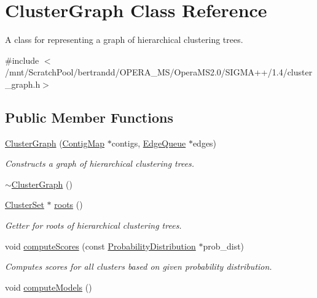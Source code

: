 \hypertarget{classClusterGraph}{
\section{ClusterGraph Class Reference}
\label{classClusterGraph}
}


A class for representing a graph of hierarchical clustering trees.  


{\ttfamily \#include $<$/mnt/ScratchPool/bertrandd/OPERA\_\-MS/OperaMS2.0/SIGMA++/1.4/cluster\_\-graph.h$>$}\subsection*{Public Member Functions}
\begin{DoxyCompactItemize}
\item 
\hyperlink{classClusterGraph_a5148b43897abe7a6d5d54b52e8bd4a9b}{ClusterGraph} (\hyperlink{contig_8h_aa2acb8d3b78def617ec4509a1f684c4e}{ContigMap} $\ast$contigs, \hyperlink{edge_8h_ada6d1f0d2fed8c49bc8ba085b524d726}{EdgeQueue} $\ast$edges)
\begin{DoxyCompactList}\small\item\em Constructs a graph of hierarchical clustering trees. \item\end{DoxyCompactList}\item 
\hyperlink{classClusterGraph_abe7d21fd3e9e14d61ed071b0def25995}{$\sim$ClusterGraph} ()
\item 
\hyperlink{cluster_8h_ac282f47ef6416737ea8a6f13a61bfd86}{ClusterSet} $\ast$ \hyperlink{classClusterGraph_a46e64fce525cf3e06a1966ef4aa3b594}{roots} ()
\begin{DoxyCompactList}\small\item\em Getter for roots of hierarchical clustering trees. \item\end{DoxyCompactList}\item 
void \hyperlink{classClusterGraph_afb7b884082ea4ef1643d6b94b3dfd0da}{computeScores} (const \hyperlink{classProbabilityDistribution}{ProbabilityDistribution} $\ast$prob\_\-dist)
\begin{DoxyCompactList}\small\item\em Computes scores for all clusters based on given probability distribution. \item\end{DoxyCompactList}\item 
void \hyperlink{classClusterGraph_a8c465a727344b22c07876cac28c9fe4c}{computeModels} ()

\end{DoxyCompactItemize}
